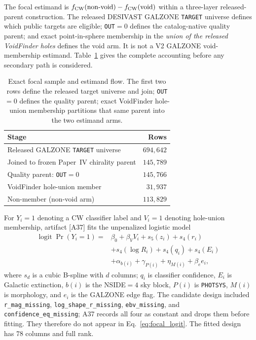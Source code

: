 \documentclass[aps,prd,twocolumn,superscriptaddress,showpacs,preprintnumbers,nofootinbib,longbibliography,floatfix]{revtex4-2}
\begin{document}
The focal estimand is
$f_{\rm CW}(\mathrm{non\mbox{-}void})-f_{\rm CW}(\mathrm{void})$ within a
three-layer released-parent construction. The released DESIVAST GALZONE
\texttt{TARGET} universe defines which public targets are eligible;
\texttt{OUT}$=0$ defines the catalog-native quality parent; and exact
point-in-sphere membership in the \emph{union of the released VoidFinder
holes} defines the void arm. It is not a V2 GALZONE void-membership
estimand. Table~\ref{tab:focal_flow} gives the complete accounting before
any secondary path is considered.

\begin{table}[!ht]
\caption{Exact focal sample and estimand flow. The first two rows define
the released target universe and join; \texttt{OUT}$=0$ defines the
quality parent; exact VoidFinder hole-union membership partitions that
same parent into the two estimand arms.}
\label{tab:focal_flow}
\begin{ruledtabular}
\begin{tabular}{lr}
Stage & Rows \\
\hline
Released GALZONE \texttt{TARGET} universe & $694{,}642$ \\
Joined to frozen Paper~IV chirality parent & $145{,}789$ \\
Quality parent: \texttt{OUT}$=0$ & $145{,}766$ \\
\quad VoidFinder hole-union member & $31{,}937$ \\
\quad Non-member (non-void arm) & $113{,}829$ \\
\end{tabular}
\end{ruledtabular}
\end{table}

For $Y_i=1$ denoting a CW classifier label and $V_i=1$ denoting
hole-union membership, artifact [A37] fits the unpenalized logistic model
\begin{align}
\operatorname{logit}\Pr(Y_i=1)={}&\beta_0+\beta_V V_i+s_5(z_i)
 +s_4(r_i) \nonumber\\
 &+s_4(\log R_i)+s_4(q_i)+s_4(E_i) \nonumber\\
 &+\alpha_{b(i)}+\gamma_{P(i)}+\eta_{M(i)}+\beta_e e_i,
\label{eq:focal_logit}
\end{align}
where $s_d$ is a cubic B-spline with $d$ columns; $q_i$ is classifier
confidence, $E_i$ is Galactic extinction, $b(i)$ is the NSIDE$=4$ sky
block, $P(i)$ is \texttt{PHOTSYS}, $M(i)$ is morphology, and $e_i$ is
the GALZONE edge flag. The candidate design included
\texttt{r\_mag\_missing}, \texttt{log\_shape\_r\_missing},
\texttt{ebv\_missing}, and \texttt{confidence\_eq\_missing}; A37 records
all four as constant and drops them before fitting. They therefore do not
appear in Eq.~\eqref{eq:focal_logit}. The fitted design has 78 columns and
full rank.
\end{document}
